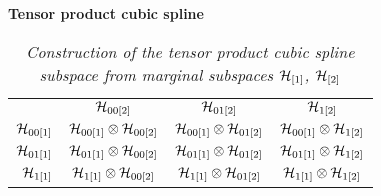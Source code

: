 \begin{example}{\textbf {Tensor product cubic spline}}
\begin{table}[H]
\centering %
\begin{tabular}{r|c|c|c|} %
\multicolumn{1}{c}{} & \multicolumn{1}{c}{	$\mathcal{H}_{00\left[2\right]}$}	&	\multicolumn{1}{c}{$\mathcal{H}_{01\left[2\right]}$}	&\multicolumn{1}{c}{ $\mathcal{H}_{1\left[2\right]}$}\\ [1.5ex] 
\cline{2-4}  %
$\mathcal{H}_{00\left[1\right]}$		& $\mathcal{H}_{00\left[1\right]}\otimes \mathcal{H}_{00\left[2\right]}$ 	&	$\mathcal{H}_{00\left[1\right]}	\otimes \mathcal{H}_{01\left[2\right]} $	&	$\mathcal{H}_{00\left[1\right]}	\otimes \mathcal{H}_{1\left[2\right]}$   \\ [1.5ex] 
$\mathcal{H}_{01\left[1\right]}$		& $\mathcal{H}_{01\left[1\right]} \otimes \mathcal{H}_{00\left[2\right]}$			& 	$\mathcal{H}_{01\left[1\right]} \otimes \mathcal{H}_{01\left[2\right]}$   &   $\mathcal{H}_{01\left[1\right]} \otimes \mathcal{H}_{1\left[2\right]}$\\ [1.5ex] 
 $\mathcal{H}_{1\left[1\right]}$	& 	 $\mathcal{H}_{1\left[1\right]} \otimes \mathcal{H}_{00\left[2\right]}$	&	$\mathcal{H}_{1\left[1\right]} \otimes \mathcal{H}_{01\left[2\right]}$ 	&	$\mathcal{H}_{1\left[1\right]} \otimes \mathcal{H}_{1\left[2\right]}$ \\ [1.5ex] 
\cline{2-4}
\end{tabular}
\caption{\textit{Construction of the tensor product cubic spline subspace from marginal subspaces $\mathcal{H}_{\left[1\right]}$, $\mathcal{H}_{\left[2\right]}$}} %
\label{table:tensor-product-cubic-spline-RKHS-table}
\end{table}


\end{example}
